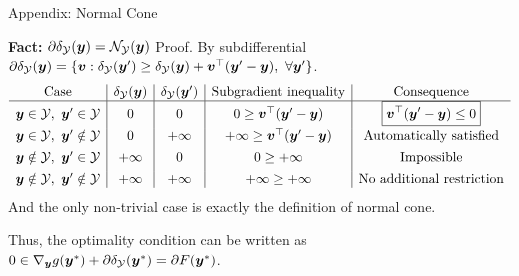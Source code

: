 \documentclass[10pt,aspectratio=169,xcolor=dvipsnames]{beamer}
\begin{document}
\begin{frame}[allowframebreaks]{Appendix: Normal Cone}
    \begin{block}{\small\textbf{Fact:} $\partial \delta_{\mathcal{Y}}({\bm{y}}) = \mathcal{N}_{\mathcal{Y}}({\bm{y}})$}
        Proof. By subdifferential $\partial \delta_{\mathcal{Y}}({\bm{y}}) = \{{\bm{v}} : \delta_{\mathcal{Y}}({\bm{y}}') \geq \delta_{\mathcal{Y}}({\bm{y}}) + {\bm{v}}^\top ({\bm{y}}' - {\bm{y}}),\ \forall {\bm{y}}'\}$.
        \[
            \begin{array}{c|c|c|c|c}
            \text{Case}
            & \delta_{\mathcal{Y}}({\bm{y}})
            & \delta_{\mathcal{Y}}({\bm{y}}')
            & \text{Subgradient inequality}
            & \text{Consequence}
            \\
            \hline
            {\bm{y}}\in \mathcal{Y},\ {\bm{y}}'\in \mathcal{Y}
            & 0
            & 0
            & 0\ge {\bm{v}}^\top({\bm{y}}'-{\bm{y}})
            & \boxed{{\bm{v}}^\top({\bm{y}}'-{\bm{y}})\le 0}
            \\[4pt]

            {\bm{y}}\in \mathcal{Y},\ {\bm{y}}'\notin \mathcal{Y}
            & 0
            & +\infty
            & +\infty\ge {\bm{v}}^\top({\bm{y}}'-{\bm{y}})
            & \text{Automatically satisfied}
            \\[4pt]

            {\bm{y}}\notin \mathcal{Y},\ {\bm{y}}'\in \mathcal{Y}
            & +\infty
            & 0
            & 0\ge +\infty
            & \text{Impossible}
            \\[4pt]

            {\bm{y}}\notin \mathcal{Y},\ {\bm{y}}'\notin \mathcal{Y}
            & +\infty
            & +\infty
            & +\infty\ge +\infty
            & \text{No additional restriction}
            \end{array}
        \]
        And the only non-trivial case is exactly the definition of normal cone.
    \end{block}
    Thus, the optimality condition can be written as $0 \in \nabla_{{\bm{y}}} g({\bm{y}}^*) + \partial \delta_{\mathcal{Y}}({\bm{y}}^*) = \partial F({\bm{y}}^*)$.
\end{frame}
\end{document}

